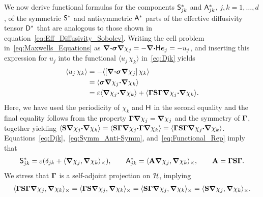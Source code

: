 \documentclass[amsa]{ipart}
\begin{document}
We now derive functional formulas for the components $\mathsf{S}^*_{jk}$ and
$\mathsf{A}^*_{jk}$, $j,k=1,\ldots,d$, of the symmetric $\mathsf{S}^*$ and antisymmetric
$\mathsf{A}^*$ parts of the effective diffusivity tensor $\mathsf{D}^*$ that are
analogous to those shown in
equation~\eqref{eq:Eff_Diffusivity_Sobolev}. Writing the cell problem
in~\eqref{eq:Maxwells_Equations} as  
$\mbox{\boldmath${\nabla}$}\mbox{\boldmath${\cdot}$}\mbox{\boldmath${\sigma}$}\mbox{\boldmath${\nabla}$}\chi_j=-\mbox{\boldmath${\nabla}$}\mbox{\boldmath${\cdot}$}\mathsf{H}\boldsymbol{e}_j=-u_j$, and
inserting this expression for $u_j$ into the functional $\langle u_j\,\chi_k\rangle$
in~\eqref{eq:Djk} yields   
%
\begin{align}\label{eq:Functional_Rep}
  \langle u_j\,\chi_k\rangle&=-\langle[\bnabla\bcdot\bsig\bnabla\chi_j]\,\chi_k\rangle
       \\\notag
       &=\langle\bsig\bnabla\chi_j\bcdot\bnabla\chi_k\rangle
       \\\notag
       &=\varepsilon\langle\bnabla\chi_j\bcdot\bnabla\chi_k\rangle
         +\langle\bGamma\Sb\bGamma\bnabla\chi_j\bcdot\bnabla\chi_k\rangle.
         \notag
\end{align}
%
Here, we have used the periodicity of $\chi_k$ and $\mathsf{H}$ in the second
equality and the final equality follows from the property
$\mbox{\boldmath${\Gamma}$}\mbox{\boldmath${\nabla}$}\chi_j=\mbox{\boldmath${\nabla}$}\chi_j$ and the symmetry of $\mbox{\boldmath${\Gamma}$}$, together
yielding
$\langle\mathbf{S}\mbox{\boldmath${\nabla}$}\chi_j\mbox{\boldmath${\cdot}$}\mbox{\boldmath${\nabla}$}\chi_k\rangle=\langle\mathbf{S}\mbox{\boldmath${\Gamma}$}\mbox{\boldmath${\nabla}$}\chi_j\mbox{\boldmath${\cdot}$}\mbox{\boldmath${\Gamma}$}\mbox{\boldmath${\nabla}$}\chi_k\rangle=\langle\mbox{\boldmath${\Gamma}$}\mathbf{S}\mbox{\boldmath${\Gamma}$}\mbox{\boldmath${\nabla}$}\chi_j\mbox{\boldmath${\cdot}$}\mbox{\boldmath${\nabla}$}\chi_k\rangle$. Equations~\eqref{eq:Djk},~\eqref{eq:Symm_Anti-Symm}, and~\eqref{eq:Functional_Rep} imply that
%
\begin{align}\label{eq:Eff_Diffusivity}
 \Sm^*_{jk}=\varepsilon(\delta_{jk}+\langle\bnabla \chi_j,\bnabla \chi_k\rangle_\times), 
  \qquad
 \Am^*_{jk}=\langle\Ab\bnabla \chi_j,\bnabla \chi_k\rangle_\times, 
  \qquad
 \Ab=\bGamma\Sb\bGamma.
\end{align}
%
We
stress that $\mbox{\boldmath${\Gamma}$}$ is a self-adjoint projection on
$\mathcal{H}$, implying
%
\begin{align}\label{eq:StoA}
                              \langle\bGamma\Sb\bGamma\bnabla\chi_j,\bnabla\chi_k\rangle_\times
                             =\langle\bGamma\Sb\bnabla\chi_j,\bnabla\chi_k\rangle_\times
                             =\langle\Sb\bGamma\bnabla\chi_j,\bnabla\chi_k\rangle_\times
                             =\langle\Sb\bnabla\chi_j,\bnabla\chi_k\rangle_\times.
\end{align}
% 
\end{document}
